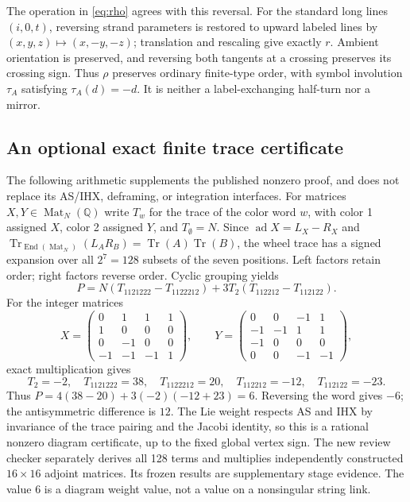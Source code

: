 \documentclass[11pt]{article}
\theoremstyle{remark}\newtheorem{remark}[theorem]{Remark}
\newcommand{\Q}{\mathbb Q}
\newcommand{\Tr}{\operatorname{Tr}}
\newcommand{\ad}{\operatorname{ad}}
\begin{document}
The operation in \eqref{eq:rho} agrees with this reversal. For the standard
long lines $(i,0,t)$, reversing strand parameters is restored to upward
labeled lines by $(x,y,z)\mapsto(x,-y,-z)$; translation and rescaling give
exactly $r$. Ambient orientation is preserved, and reversing both tangents
at a crossing preserves its crossing sign. Thus $\rho$ preserves ordinary
finite-type order, with symbol involution $\tau_A$ satisfying
$\tau_A(d)=-d$. It is neither a label-exchanging half-turn nor a mirror.

\subsection{An optional exact finite trace certificate}
The following arithmetic supplements the published nonzero proof, and
does not replace its AS/IHX, deframing, or integration interfaces.
For matrices $X,Y\in\operatorname{Mat}_N(\Q)$ write $T_w$ for the trace of
the color word $w$, with color 1 assigned $X$, color 2 assigned $Y$,
and $T_\emptyset=N$. Since $\ad X=L_X-R_X$ and
$\Tr_{\operatorname{End}(\operatorname{Mat}_N)}(L_A R_B)=\Tr(A)\Tr(B)$,
the wheel trace has a signed expansion over all $2^7=128$ subsets of the
seven positions. Left factors retain order; right factors reverse order.
Cyclic grouping yields
\begin{equation}\label{eq:wheel}
P=N(T_{1121222}-T_{1122212})
   +3T_2(T_{112212}-T_{112122}).
\end{equation}
For the integer matrices
\[
X=\begin{pmatrix}0&1&1&1\\1&0&0&0\\0&-1&0&0\\-1&-1&-1&1\end{pmatrix},
\qquad
Y=\begin{pmatrix}0&0&-1&1\\-1&-1&1&1\\-1&0&0&0\\0&0&-1&-1\end{pmatrix},
\]
exact multiplication gives
\[
T_2=-2,\quad T_{1121222}=38,\quad T_{1122212}=20,
\quad T_{112212}=-12,\quad T_{112122}=-23.
\]
Thus $P=4(38-20)+3(-2)(-12+23)=6$. Reversing the word gives $-6$;
the antisymmetric difference is $12$. The Lie weight respects AS and IHX
by invariance of the trace pairing and the Jacobi identity, so this is
a rational nonzero diagram certificate, up to the fixed global vertex sign.
The new review checker separately derives all 128 terms and multiplies
independently constructed $16\times16$ adjoint matrices. Its frozen results
are supplementary stage evidence. The value $6$ is a diagram weight value,
not a value on a nonsingular string link.
\end{document}
